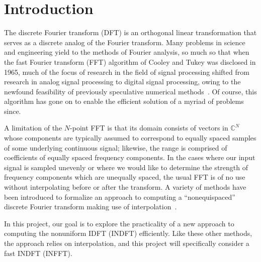 \section{Introduction}

The discrete Fourier transform (DFT) is an orthogonal linear
transformation that serves as a discrete analog of the Fourier
transform. Many problems in science and engineering yield to the
methods of Fourier analysis, so much so that when the fast Fourier
transform (FFT) algorithm of Cooley and Tukey was disclosed in 1965,
much of the focus of research in the field of signal processing
shifted from research in analog signal processing to digital signal
processing, owing to the newfound feasibility of previously
speculative numerical methods~\cite{book:dsp75}. Of course, this
algorithm has gone on to enable the efficient solution of a myriad of
problems since.

A limitation of the $N$-point
FFT is that its domain consists of vectors in $\mathbb{C}^N$
whose components are typically assumed to correspond to equally spaced
samples of some underlying continuous signal; likewise, the range is
comprised of coefficients of equally spaced frequency components. In
the cases where our input signal is sampled unevenly or where we would
like to determine the strength of frequency components which are
unequally spaced, the usual FFT is of no use without interpolating
before or after the transform. A variety of methods have been
introduced to formalize an approach to computing a ``nonequispaced''
discrete Fourier transform making use of
interpolation~\cite{Dutt95fastfourierII,Keiner06nfft3.0}.

In this project, our goal is to explore the practicality of a new
approach to computing the nonuniform IDFT (INDFT) efficiently. Like
these other methods, the approach relies on interpolation, and this
project will specifically consider a fast INDFT (INFFT).

